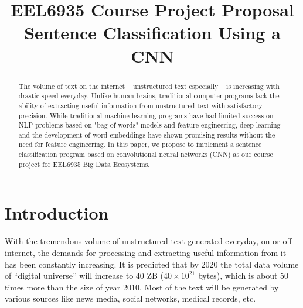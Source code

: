 \documentclass[conference]{IEEEtran}
\begin{document}
\title{EEL6935 Course Project Proposal \\
    Sentence Classification Using a CNN}
\author{
}

\maketitle

\begin{abstract}
    The volume of text on the internet -- unstructured text especially --
    is increasing with drastic speed everyday. Unlike
    human brains, traditional computer programs lack the ability of extracting
    useful information from unstructured text with satisfactory precision.
    While traditional machine learning programs have had limited success
    on NLP problems based on "bag of words" models and feature engineering,
    deep learning and the development of word embeddings have shown
    promising results without the need for feature engineering. In this paper,
    we propose to implement a sentence classification program based on
    convolutional neural networks (CNN) as our course project for
    EEL6935 Big Data Ecosystems.
\end{abstract}

\IEEEpeerreviewmaketitle

\section{Introduction}
    With the tremendous volume of unstructured text generated everyday, on or off
    internet, the demands for processing and extracting useful information
    from it has been constantly increasing. It is predicted that by 2020 the
    total data volume of ``digital universe'' will increase to 40 ZB
    ($40\times 10^{21}$ bytes), which is about 50 times more than the size of
    year 2010\cite{gantz2012digital}. Most of the text will be generated by various
    sources like news media, social networks, medical records, etc.
\end{document}
